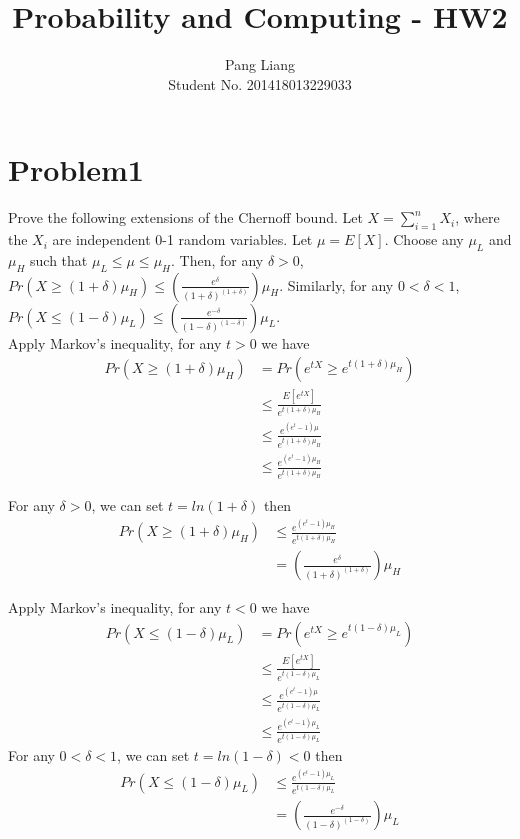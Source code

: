 \documentclass[12pt]{article}
\title{Probability and Computing - HW2}
\author{Pang Liang\\ Student No. 201418013229033}
\begin{document}
\maketitle

\section{Problem1}
Prove the following extensions of the Chernoff bound. Let $X=\sum_{i=1}^{n} X_i$, where the $X_i$ are independent 0-1 random variables. Let $\mu = E[X]$. Choose any $\mu_L$ and $\mu_H$ such that $\mu_L \le \mu \le \mu_H$. Then, for any $\delta > 0$, $Pr(X \ge (1+\delta) \mu_H) \le (\frac{e^\delta}{(1+\delta)^{(1+\delta)}}) \mu_H$.
Similarly, for any $0 < \delta < 1$, $Pr(X \le (1-\delta) \mu_L) \le (\frac{e^{-\delta}}{(1-\delta)^{(1-\delta)}}) \mu_L$.\\

Apply Markov's inequality, for any $t>0$ we have
\begin{equation}
    \begin{split}
    Pr(X \ge (1+\delta) \mu_H) &= Pr(e^{tX} \ge e^{t(1+\delta)\mu_H})\\
    &\le \frac{E[e^{tX}]}{e^{t(1+\delta)\mu_H}} \\
    &\le \frac{e^{(e^t-1)\mu}}{e^{t(1+\delta)\mu_H}} \\
    &\le \frac{e^{(e^t-1)\mu_H}}{e^{t(1+\delta)\mu_H}}
    \end{split}
\end{equation}

For any $\delta>0$, we can set $t=ln(1+\delta)$ then
\begin{equation}
    \begin{split}
    Pr(X \ge (1+\delta) \mu_H) &\le \frac{e^{(e^t-1)\mu_H}}{e^{t(1+\delta)\mu_H}} \\
    &= (\frac{e^\delta}{(1+\delta)^{(1+\delta)}}) \mu_H
    \end{split}
\end{equation}

Apply Markov's inequality, for any $t<0$ we have
\begin{equation}
    \begin{split}
    Pr(X \le (1-\delta) \mu_L) &= Pr(e^{tX} \ge e^{t(1-\delta)\mu_L})\\
    &\le \frac{E[e^{tX}]}{e^{t(1-\delta)\mu_L}} \\
    &\le \frac{e^{(e^t-1)\mu}}{e^{t(1-\delta)\mu_L}} \\
    &\le \frac{e^{(e^t-1)\mu_L}}{e^{t(1-\delta)\mu_L}}
    \end{split}
\end{equation}
For any $0<\delta<1$, we can set $t=ln(1-\delta)<0$ then
\begin{equation}
    \begin{split}
    Pr(X \le (1-\delta) \mu_L) &\le \frac{e^{(e^t-1)\mu_L}}{e^{t(1-\delta)\mu_L}} \\
    &= (\frac{e^{-\delta}}{(1-\delta)^{(1-\delta)}}) \mu_L
    \end{split}
\end{equation}
\end{document}
